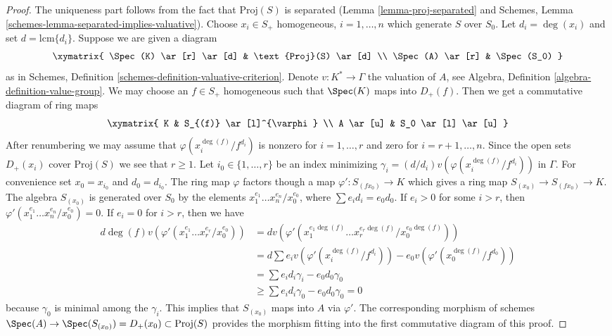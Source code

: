 \begin{proof}
The uniqueness part follows from the fact that $\text{Proj}(S)$ is
separated (Lemma \ref{lemma-proj-separated} and
Schemes, Lemma \ref{schemes-lemma-separated-implies-valuative}).
Choose $x_i \in S_{+}$ homogeneous, $i = 1, \ldots, n$
which generate $S$ over $S_0$. Let $d_i = \deg(x_i)$ and
set $d = \text{lcm}\{d_i\}$. Suppose we are given a diagram
$$
\xymatrix{
\Spec(K) \ar[r] \ar[d] & \text{Proj}(S) \ar[d] \\
\Spec(A) \ar[r] & \Spec(S_0)
}
$$
as in Schemes, Definition \ref{schemes-definition-valuative-criterion}.
Denote $v : K^* \to \Gamma$ the valuation of $A$, see
Algebra, Definition \ref{algebra-definition-value-group}.
We may choose an $f \in S_{+}$ homogeneous such that
$\Spec(K)$ maps into $D_{+}(f)$. Then we get a commutative
diagram of ring maps
$$
\xymatrix{
K & S_{(f)} \ar[l]^{\varphi} \\
A \ar[u] & S_0 \ar[l] \ar[u]
}
$$
After renumbering we may assume that $\varphi(x_i^{\deg(f)}/f^{d_i})$
is nonzero for $i = 1, \ldots, r$ and zero for $i = r + 1, \ldots, n$.
Since the open sets $D_{+}(x_i)$ cover $\text{Proj}(S)$ we see that $r \geq 1$.
Let $i_0 \in \{1, \ldots, r\}$ be an index minimizing
$\gamma_i = (d/d_i)v(\varphi(x_i^{\deg(f)}/f^{d_i}))$ in $\Gamma$.
For convenience set $x_0 = x_{i_0}$ and $d_0 = d_{i_0}$.
The ring map $\varphi$ factors though a map $\varphi' : S_{(fx_0)} \to K$
which gives a ring map $S_{(x_0)} \to S_{(fx_0)} \to K$.
The algebra $S_{(x_0)}$ is generated over $S_0$ by the elements
$x_1^{e_1} \ldots x_n^{e_n}/x_0^{e_0}$, where $\sum e_i d_i = e_0 d_0$.
If $e_i > 0$ for some $i > r$, then
$\varphi'(x_1^{e_1} \ldots x_n^{e_n}/x_0^{e_0}) = 0$.
If $e_i = 0$ for $i > r$, then we have
\begin{align*}
d \deg(f) v(\varphi'(x_1^{e_1} \ldots x_r^{e_r}/x_0^{e_0}))
& =
d v(\varphi'(x_1^{e_1 \deg(f)} \ldots x_r^{e_r \deg(f)}/x_0^{e_0 \deg(f)})) \\
& =
d \sum e_i v(\varphi'(x_i^{\deg(f)}/f^{d_i}))
- e_0 v(\varphi'(x_0^{\deg(f)}/f^{d_0})) \\
& =
\sum e_i d_i \gamma_i - e_0 d_0 \gamma_0 \\
& \geq
\sum e_i d_i \gamma_0 - e_0 d_0 \gamma_0 = 0
\end{align*}
because $\gamma_0$ is minimal among the $\gamma_i$.
This implies that $S_{(x_0)}$ maps into $A$ via $\varphi'$.
The corresponding morphism of schemes
$\Spec(A) \to \Spec(S_{(x_0)}) = D_{+}(x_0)
\subset \text{Proj}(S)$ provides the morphism fitting into
the first commutative diagram of this proof.
\end{proof}

